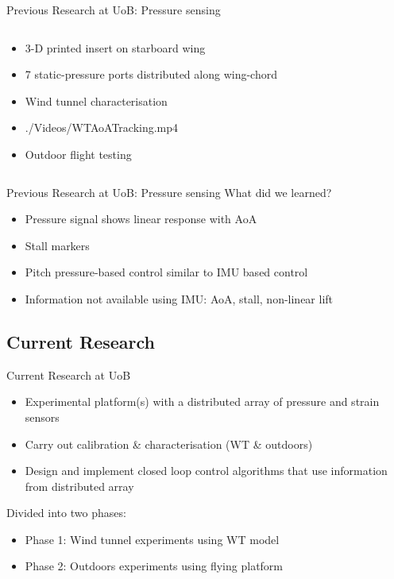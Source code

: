 \documentclass[aspectratio=169]{beamer}            %
\begin{document}
\begin{frame}{Previous Research at UoB: Pressure sensing}
\begin{columns}
\begin{column}{0.4\textwidth}
		  \begin{itemize}
				\item<2-> 3-D printed insert on starboard wing
				\item<3-> 7 static-pressure ports distributed along wing-chord
				\item<4-> Wind tunnel characterisation
				\item<5-> 
					{./Videos/WTAoATracking.mp4}
				\item<6-> Outdoor flight testing
			\end{itemize}
		\end{column}
  \end{columns}
	
\end{frame}

\begin{frame}{Previous Research at UoB: Pressure sensing}
  What did we learned?
	\pause
    \begin{itemize}[<+->]
      \item Pressure signal shows linear response with AoA
      \item Stall markers
      \item Pitch pressure-based control similar to IMU based control
			\item Information not available using IMU: AoA, stall, non-linear lift
    \end{itemize}
\end{frame}

\subsection[Current Research]{Current Research}

\begin{frame}{Current Research at UoB}

  \pause
	\begin{itemize}[<+->]
    \item Experimental platform(s) with a distributed array of pressure and strain sensors
    \item Carry out calibration \& characterisation (WT \& outdoors)
    \item Design and implement closed loop control algorithms that use information from distributed array
  \end{itemize}
	\pause
  Divided into two phases:
	\pause
  \begin{itemize}[<+->]
    \item Phase 1: Wind tunnel experiments using WT model
    \item Phase 2: Outdoors experiments using flying platform
  \end{itemize}
  
\end{frame}
\end{document}
